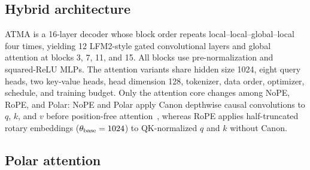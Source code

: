\documentclass{article}
\newcommand{\rev}[1]{{\color{revcolor}#1}}
\begin{document}
\subsection{Hybrid architecture}

ATMA is a 16-layer decoder whose block order repeats local--local--global--local four times, yielding 12 LFM2-style gated convolutional layers and global attention at blocks 3, 7, 11, and 15. All blocks use pre-normalization and squared-ReLU MLPs. The attention variants share hidden size 1024, eight query heads, two key-value heads, head dimension 128, tokenizer, data order, optimizer, schedule, and training budget. Only the attention core changes among NoPE, RoPE, and Polar: \rev{NoPE and Polar apply Canon depthwise causal convolutions to $q$, $k$, and $v$ before position-free attention~\citep{physics_lms_2025}, whereas RoPE applies half-truncated rotary embeddings ($\theta_{\rm base}=1024$) to QK-normalized $q$ and $k$ without Canon.}

\subsection{Polar attention}
\end{document}
